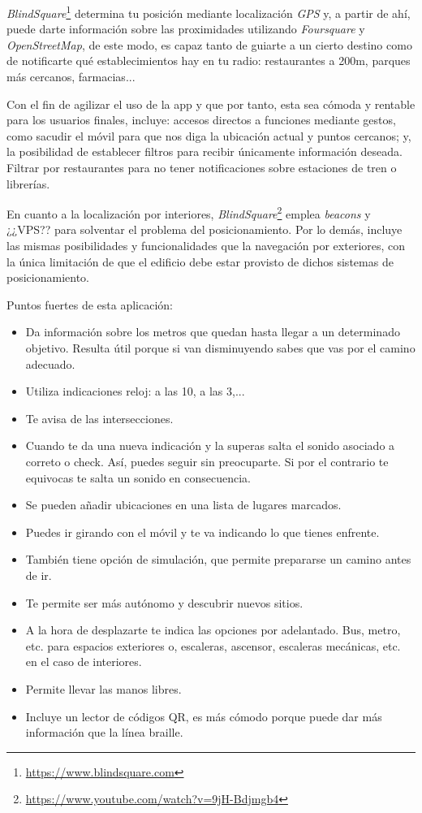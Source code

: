 \documentclass{article}
\begin{document}
	    \textit{BlindSquare}\footnote{\url{https://www.blindsquare.com}} determina tu posición mediante localización \textit{GPS} y, a partir de ahí, puede darte información sobre las proximidades utilizando \textit{Foursquare} y \textit{OpenStreetMap}, de este modo, es capaz tanto de guiarte a un cierto destino como de notificarte qué establecimientos hay en tu radio: restaurantes a 200m, parques más cercanos, farmacias...
	
	    Con el fin de agilizar el uso de la app y que por tanto, esta sea cómoda y rentable para los usuarios finales, incluye: accesos directos a funciones mediante gestos, como sacudir el móvil para que nos diga la ubicación actual y puntos cercanos; y, la posibilidad de establecer filtros para recibir únicamente información deseada. Filtrar por restaurantes para no tener notificaciones sobre estaciones de tren o librerías.
	
	    En cuanto a la localización por interiores, \textit{BlindSquare}\footnote{\url{https://www.youtube.com/watch?v=9jH-Bdjmgb4}} emplea \textit{beacons} y ¿¿VPS?? para solventar el problema del posicionamiento. Por lo demás, incluye las mismas posibilidades y funcionalidades que la navegación por exteriores, con la única limitación de que el edificio debe estar provisto de dichos sistemas de posicionamiento.
	
	    Puntos fuertes de esta aplicación:
	    \begin{itemize}
		    \item Da información sobre los metros que quedan hasta llegar a un determinado objetivo. Resulta útil porque si van disminuyendo sabes que vas por el camino adecuado.
		    \item Utiliza indicaciones reloj: a las 10, a las 3,...
		    \item Te avisa de las intersecciones. 
		    \item Cuando te da una nueva indicación y la superas salta el sonido asociado a correto o check. Así, puedes seguir sin preocuparte. Si por el contrario te equivocas te salta un sonido en consecuencia.
		    \item Se pueden añadir ubicaciones en una lista de lugares marcados.
		    \item Puedes ir girando con el móvil y te va indicando lo que tienes enfrente. 
		    \item También tiene opción de simulación, que permite prepararse un camino antes de ir.
		    \item Te permite ser más autónomo y descubrir nuevos sitios.
		    \item A la hora de desplazarte te indica las opciones por adelantado. Bus, metro, etc. para espacios exteriores o, escaleras, ascensor, escaleras mecánicas, etc. en el caso de interiores.
		    \item Permite llevar las manos libres.
		    \item Incluye un lector de códigos QR, es más cómodo porque puede dar más información que la línea braille.
	    \end{itemize}
\end{document}
